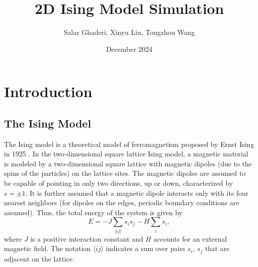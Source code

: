 \documentclass[11pt]{article}
\title{2D Ising Model Simulation}
\author{Salar Ghaderi, Xinyu Liu, Tongzhou Wang}
\date{December 2024}
\begin{document}
\maketitle


\section{Introduction}
\subsection{The Ising Model}
The Ising model is a theoretical model of ferromagnetism proposed by Ernst Ising in 1925 \cite{ising1925contribution, kramers1941statistics}. In the two-dimensional square lattice Ising model, a magnetic material is modeled by a two-dimensional square lattice with magnetic dipoles (due to the spins of the particles) on the lattice sites. The magnetic dipoles are assumed to be capable of pointing in only two directions, up or down, characterized by $s = \pm 1$. It is further assumed that a magnetic dipole interacts only with its four nearest neighbors (for dipoles on the edges, periodic boundary conditions are assumed). Thus, the total energy of the system is given by
\begin{equation}\label{Hamiltonian}
    E = -J \sum_{\langle ij \rangle} s_i s_j - H \sum_{i} s_i,
\end{equation}
where $J$ is a positive interaction constant and $H$ accounts for an external magnetic field. The notation $\langle ij \rangle$ indicates a sum over pairs $s_i$, $s_j$ that are adjacent on the lattice.
\end{document}
